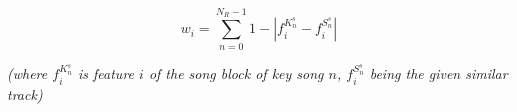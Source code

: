 \begin{equation}
w_i = \sum_{n=0}^{N_R-1} 1 - |f_i^{K_n^s} - f_i^{S_n^s}|
\label{eq:weight_optimisation_old}
\end{equation}
\begin{center}
	\small \emph{(where $f_i^{K_n^s}$ is feature $i$ of the song block of key song $n$, $f_i^{S_n^s}$ being the given similar track)}
\end{center}
